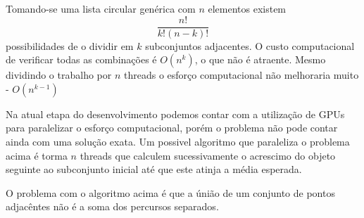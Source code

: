 	Tomando-se uma lista circular genérica com $n$ elementos existem 
\[\frac{n!}{k!(n-k)!}\]
	possibilidades de o dividir em $k$ subconjuntos adjacentes. O custo
computacional de verificar todas as combinações é $O(n^k)$, o que não é
atraente. Mesmo dividindo o trabalho por $n$ threads o esforço computacional não
melhoraria muito - $O(n^{k-1})$

	Na atual etapa do desenvolvimento podemos contar com a utilização de GPUs
para paralelizar o esforço computacional, porém o problema não pode contar ainda
com uma solução exata. Um possivel algoritmo que paraleliza o problema acima é
torma $n$ threads que calculem sucessivamente o acrescimo do objeto seguinte ao
subconjunto inicial até que este atinja a média esperada.

	O problema com o algoritmo acima é que a únião de um conjunto de pontos
adjacêntes não é a soma dos percursos separados.












